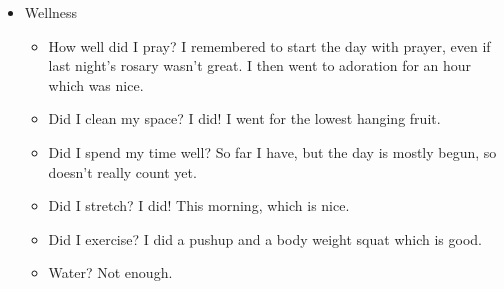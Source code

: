 \documentclass[12pt]{article}[titlepage]
\newcommand{\1}{\={a}}
\newcommand{\2}{\={e}}
\newcommand{\3}{\={\i}}
\newcommand{\4}{\=o}
\newcommand{\5}{\=u}
\newcommand{\6}{\={A}}
\renewcommand{\,}{\textsuperscript{,}}
\begin{document}
\begin{itemize}
\begin{itemize}
\end{itemize}
\item Wellness
\begin{itemize}
\item How well did I pray? I remembered to start the day with prayer, even if last night's rosary wasn't great. I then went to adoration for an hour which was nice. 
\item Did I clean my space? I did! I went for the lowest hanging fruit. 
\item Did I spend my time well? So far I have, but the day is mostly begun, so doesn't really count yet. 
\item Did I stretch? I did! This morning, which is nice. 
\item Did I exercise? I did a pushup and a body weight squat which is good. 
\item Water? Not enough. 
\end{itemize} 
\end{itemize}
\end{document}

